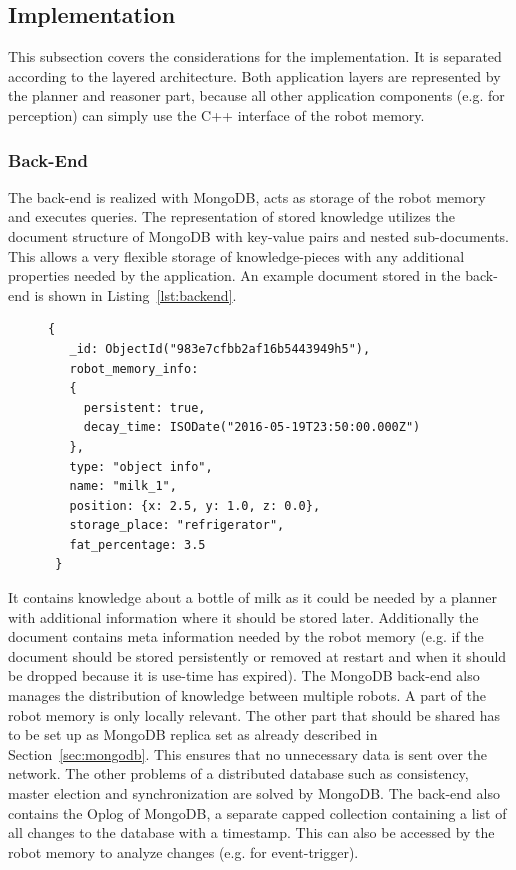 \documentclass[a4paper,11pt]{article}
\newcommand{\refsec}[1]{Section~\ref{#1}}
\newcommand{\reflst}[1]{Listing~\ref{#1}}
\begin{document}
\subsection{Implementation}
\label{sec:impl}
This subsection covers the considerations for the implementation. It is
separated according to the layered architecture. Both application
layers are represented by the planner and reasoner part, because all
other application components (e.g. for perception) can simply use the
C++ interface of the robot memory.

\subsubsection{Back-End}
\label{sec:back-end}
The back-end is realized with MongoDB, acts as storage of the robot
memory and executes queries. The representation of stored knowledge
utilizes the document structure of MongoDB with key-value pairs and
nested sub-documents. This allows a very flexible storage of
knowledge-pieces with any additional properties needed by the
application. An example document stored in the back-end is shown in
\reflst{lst:backend}. 
\begin{figure}
\begin{lstlisting}[style=SmallJSON,
  caption={Representation of a knowledge piece in the back-end},
  label=lst:backend,
  framexleftmargin=15pt, xleftmargin=15pt,
 morekeywords={}]
 {
   _id: ObjectId("983e7cfbb2af16b5443949h5"),
   robot_memory_info:
   {
     persistent: true,
     decay_time: ISODate("2016-05-19T23:50:00.000Z")
   },
   type: "object info",
   name: "milk_1",
   position: {x: 2.5, y: 1.0, z: 0.0},
   storage_place: "refrigerator",
   fat_percentage: 3.5
 }
\end{lstlisting}
\end{figure}
It contains knowledge about a bottle of milk as it could be needed by
a planner with additional information where it should be stored
later. Additionally the document contains meta information needed by
the robot memory (e.g. if the document should be stored persistently
or removed at restart and when it should be dropped because it is
use-time has expired). The MongoDB back-end also manages the
distribution of knowledge between multiple robots. A part of the robot
memory is only locally relevant. The other part that should be shared
has to be set up as MongoDB replica set as already described in
\refsec{sec:mongodb}. This ensures that no unnecessary data is sent
over the network. The other problems of a distributed database such as
consistency, master election and synchronization are solved by
MongoDB. The back-end also contains the Oplog of MongoDB, a separate
capped collection containing a list of all changes to the database
with a timestamp. This can also be accessed by the robot memory to
analyze changes (e.g. for event-trigger).
\end{document}
